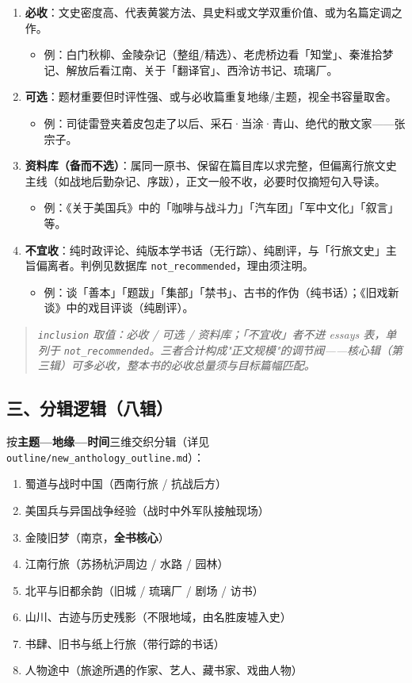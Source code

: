 \documentclass[UTF8,fontset=none,zihao=-4,a4paper]{ctexart}
\begin{document}
\begin{enumerate}
\item \textbf{必收}：文史密度高、代表黄裳方法、具史料或文学双重价值、或为名篇定调之作。
\begin{itemize}
\item 例：白门秋柳、金陵杂记（整组/精选）、老虎桥边看「知堂」、秦淮拾梦记、解放后看江南、关于「翻译官」、西泠访书记、琉璃厂。
\end{itemize}
\item \textbf{可选}：题材重要但时评性强、或与必收篇重复地缘/主题，视全书容量取舍。
\begin{itemize}
\item 例：司徒雷登夹着皮包走了以后、采石·当涂·青山、绝代的散文家——张宗子。
\end{itemize}
\item \textbf{资料库（备而不选）}：属同一原书、保留在篇目库以求完整，但偏离行旅文史主线（如战地后勤杂记、序跋），正文一般不收，必要时仅摘短句入导读。
\begin{itemize}
\item 例：《关于美国兵》中的「咖啡与战斗力」「汽车团」「军中文化」「叙言」等。
\end{itemize}
\item \textbf{不宜收}：纯时政评论、纯版本学书话（无行踪）、纯剧评，与「行旅文史」主旨偏离者。判例见数据库 \texttt{not\_recommended}，理由须注明。
\begin{itemize}
\item 例：谈「善本」「题跋」「集部」「禁书」、古书的作伪（纯书话）；《旧戏新谈》中的戏目评谈（纯剧评）。
\end{itemize}
\end{enumerate}


\begin{quote}\small\itshape
\texttt{inclusion} 取值：必收 / 可选 / 资料库；「不宜收」者不进 essays 表，单列于 \texttt{not\_recommended}。三者合计构成"正文规模"的调节阀——核心辑（第三辑）可多必收，整本书的必收总量须与目标篇幅匹配。
\end{quote}

\subsection{三、分辑逻辑（八辑）}


按\textbf{主题—地缘—时间}三维交织分辑（详见 \texttt{outline/new\_anthology\_outline.md}）：

\begin{enumerate}
\item 蜀道与战时中国（西南行旅 / 抗战后方）
\item 美国兵与异国战争经验（战时中外军队接触现场）
\item 金陵旧梦（南京，\textbf{全书核心}）
\item 江南行旅（苏扬杭沪周边 / 水路 / 园林）
\item 北平与旧都余韵（旧城 / 琉璃厂 / 剧场 / 访书）
\item 山川、古迹与历史残影（不限地域，由名胜废墟入史）
\item 书肆、旧书与纸上行旅（带行踪的书话）
\item 人物途中（旅途所遇的作家、艺人、藏书家、戏曲人物）
\end{enumerate}
\end{document}
